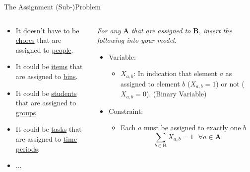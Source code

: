 \documentclass[10pt, aspectratio=169]{beamer}
\begin{document}
\begin{frame}{The Assignment (Sub-)Problem}
    \begin{columns}
        \begin{column}{0.5\textwidth}
            \begin{itemize}
                \item It doesn't have to be \underline{chores} that are assigned to \underline{people}.
                \item It could be \underline{items} that are assigned to \underline{bins}.
                \item It could be \underline{students} that are assigned to \underline{groups}.
                \item It could be \underline{tasks} that are assigned to \underline{time periods}.
                \item ...
            \end{itemize}
        \end{column}
        \begin{column}{0.5\textwidth}
            \begin{center}
                \textit{For any} $\underline{\textbf{A}}$ \textit{that are assigned to} $\underline{\textbf{B}}$\textit{, insert the following into your model.}
            \end{center}
            \begin{itemize}
                \item Variable:
                \begin{itemize}
                    \item $X_{a,b}$: In indication that element $a$ as assigned to element $b$ ($X_{a,b} = 1$) or not ($X_{a,b} = 0$). (Binary Variable)
                \end{itemize}
                \item Constraint:
                \begin{itemize}
                    \item Each $a$ must be assigned to exactly one $b$
                    $$\sum_{b \in \textbf{B}} X_{a,b} = 1 \ \ \ \forall a \in \textbf{A}$$
                \end{itemize}
            \end{itemize}
        \end{column}
    \end{columns}
\end{frame}
\end{document}
